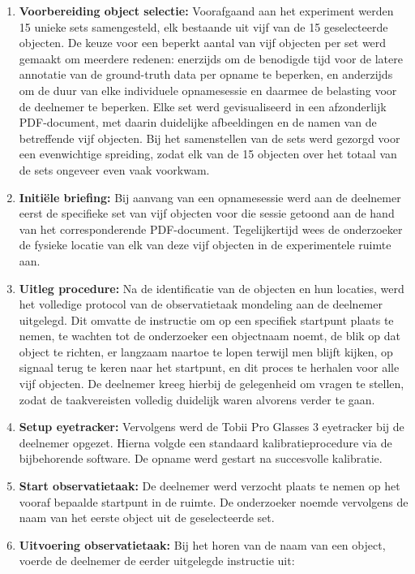 \begin{enumerate}
  \item \textbf{Voorbereiding object selectie:} Voorafgaand aan het experiment werden 15 unieke sets samengesteld, 
  elk bestaande uit vijf van de 15 geselecteerde objecten. 
  De keuze voor een beperkt aantal van vijf objecten per set werd gemaakt om meerdere redenen: 
  enerzijds om de benodigde tijd voor de latere annotatie van de ground-truth data per opname te beperken, 
  en anderzijds om de duur van elke individuele opnamesessie en daarmee de belasting voor de deelnemer te beperken.
  Elke set werd gevisualiseerd in een afzonderlijk PDF-document, met daarin duidelijke 
  afbeeldingen en de namen van de betreffende vijf objecten. 
  Bij het samenstellen van de sets werd gezorgd voor een evenwichtige spreiding, 
  zodat elk van de 15 objecten over het totaal van de sets ongeveer even vaak voorkwam.
  \item \textbf{Initiële briefing:} Bij aanvang van een opnamesessie werd aan de deelnemer eerst de specifieke 
  set van vijf objecten voor die sessie getoond aan de hand van het corresponderende PDF-document. 
  Tegelijkertijd wees de onderzoeker de fysieke locatie van elk van deze vijf objecten in de experimentele ruimte aan.
  \item \textbf{Uitleg procedure:} Na de identificatie van de objecten en hun locaties, 
  werd het volledige protocol van de observatietaak mondeling aan de deelnemer uitgelegd. 
  Dit omvatte de instructie om op een specifiek startpunt plaats te nemen, te wachten tot de onderzoeker een objectnaam noemt, 
  de blik op dat object te richten, er langzaam naartoe te lopen terwijl men blijft kijken, op signaal terug te keren naar het startpunt, 
  en dit proces te herhalen voor alle vijf objecten. 
  De deelnemer kreeg hierbij de gelegenheid om vragen te stellen, zodat de taakvereisten volledig duidelijk waren alvorens verder te gaan.
  \item \textbf{Setup eyetracker:} Vervolgens werd de Tobii Pro Glasses 3 eyetracker bij de deelnemer opgezet. 
  Hierna volgde een standaard kalibratieprocedure via de bijbehorende software. 
  De opname werd gestart na succesvolle kalibratie.
  \item \textbf{Start observatietaak:} De deelnemer werd verzocht plaats te nemen op het vooraf bepaalde startpunt in de ruimte. 
  De onderzoeker noemde vervolgens de naam van het eerste object uit de geselecteerde set.
  \item \textbf{Uitvoering observatietaak:} Bij het horen van de naam van een object, voerde de deelnemer de eerder uitgelegde instructie uit: 

\end{enumerate}
